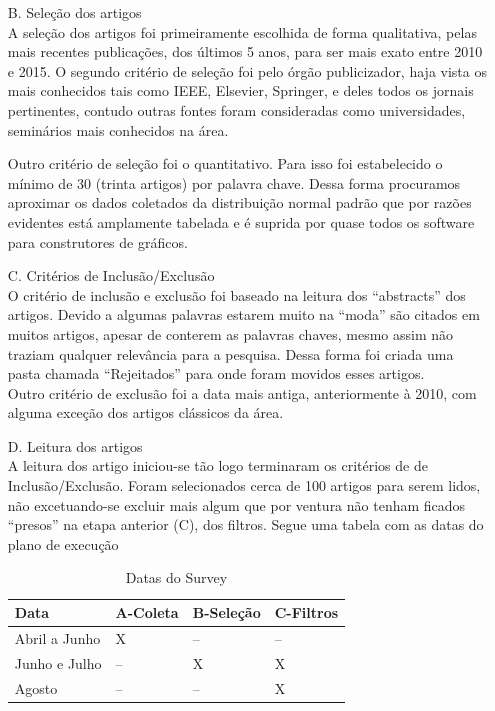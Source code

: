 \documentclass[conference,compsoc]{IEEEtran}
\begin{document}
\begin{enumerate}
  \item[B.] Seleção dos artigos\\
  A seleção dos artigos foi primeiramente escolhida de forma qualitativa, pelas mais recentes publicações, 
  dos últimos 5 anos, para ser mais exato entre 2010 e 2015. O segundo critério de seleção foi pelo órgão publicizador, 
  haja vista os mais conhecidos tais como IEEE, Elsevier, Springer, e deles todos os jornais pertinentes, contudo
  outras fontes foram consideradas como universidades, seminários mais conhecidos na área.

  Outro critério de seleção foi o quantitativo. Para isso foi estabelecido o mínimo de 30 (trinta artigos) por palavra chave.
  Dessa forma procuramos aproximar os dados coletados da distribuição normal padrão que por razões evidentes está amplamente
  tabelada e é suprida por quase todos os software para construtores de gráficos.\\

  \item[C.] Critérios de Inclusão/Exclusão \\
  O critério de inclusão e exclusão foi baseado na leitura dos ``abstracts'' dos artigos. 
  Devido a algumas palavras estarem muito na ``moda'' são citados em muitos artigos, apesar de conterem as palavras chaves,
  mesmo assim não traziam qualquer relevância para a pesquisa. Dessa forma foi criada uma pasta chamada “Rejeitados” 
  para onde foram movidos esses artigos.\\
  Outro critério de exclusão foi a data mais antiga, anteriormente à 2010, com alguma exceção dos artigos clássicos da área.\\

  \item[D.] Leitura dos artigos \\
  A leitura dos artigo iniciou-se tão logo terminaram os critérios de de Inclusão/Exclusão.
  Foram selecionados cerca de 100 artigos para serem lidos, não excetuando-se excluir mais algum que por ventura não 
  tenham ficados ``presos'' na etapa anterior (C), dos filtros.
  Segue uma tabela com as datas do plano de execução
  
  \begin{table}[htbp]
  \scriptsize
  \centering
  \caption{Datas do Survey}
  \begin{tabular}{|p{18mm}|p{8mm}|p{8mm}|p{8mm}|}
  \hline
  Data & A-Coleta & B-Seleção & C-Filtros \\
  \hline
  Abril a Junho & X & -- & -- \\ \hline
  Junho e Julho & -- & X & X \\ \hline
  Agosto & -- & -- & X \\ \hline

  \end{tabular}
  \end{table}


\end{enumerate}
\end{document}
